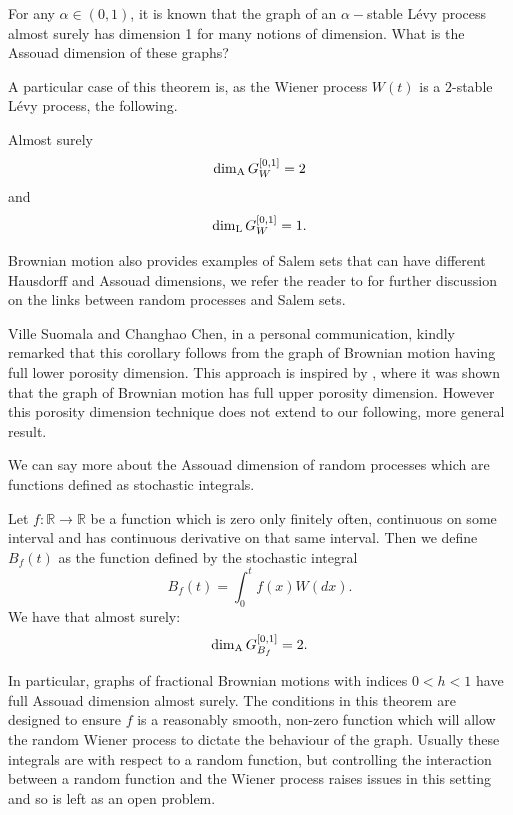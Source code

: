 \begin{question}
For any $\alpha \in (0,1)$, it is known that the graph of an $\alpha-$stable L\'evy process almost surely has dimension 1 for many notions of dimension. What is the Assouad dimension of these graphs?
\end{question}


A particular case of this theorem is, as the Wiener process $W(t)$ is a $2$-stable L\'evy process, the following.
\begin{corollary}
Almost surely
	\[
	\dim_{\textup{A}} G_{W}^{[0,1]}=2
	\]
	and 
	\[
	\dim_{\textup{L}} G_{W}^{[0,1]}=1.
	\]
\end{corollary}

Brownian motion also provides examples of Salem sets that can have different Hausdorff and Assouad dimensions, we refer the reader to \cite{Ka}  for further discussion on the links between random processes and Salem sets.

Ville Suomala and Changhao Chen, in a personal communication, kindly remarked that this corollary follows from the graph of Brownian motion having full lower porosity dimension. This approach is inspired by \cite{coxgriffin}, where it was shown that the graph of Brownian motion has full upper porosity dimension. However this porosity dimension technique does not extend to our following, more general result.

We can say more about the Assouad dimension of random processes which are functions defined as stochastic integrals. 

\begin{theorem}\label{ch-brownian:stochastic}
	Let $f:\mathbb{R}\to\mathbb{R}$ be a function which is zero only finitely often, continuous on some interval and has continuous derivative on that same interval. Then we define $B_f(t)$ as the function defined by the stochastic integral
	\[	
	B_f(t)=\int_0^t f(x) W(dx).
	\]
	We have that almost surely:
	\[
	\dim_{\textup{A}} G_{B_f}^{[0,1]}=2.
	\]
\end{theorem}

In particular, graphs of fractional Brownian motions with indices $0<h<1$ have full Assouad dimension almost surely. The conditions in this theorem are designed to ensure $f$ is a reasonably smooth, non-zero function which will allow the random Wiener process to dictate the behaviour of the graph. Usually these integrals are with respect to a random function, but controlling the interaction between a random function and the Wiener process raises issues in this setting and so is left as an open problem. 

